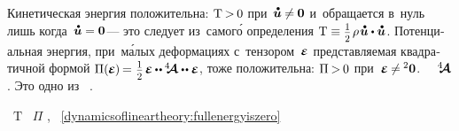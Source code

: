 \begin{otherlanguage}{russian}
\vspace{-0.1em}
Кинетическая энергия положительна: ${\mathrm{T} \hspace{-0.2ex} > \hspace{-0.2ex} 0}$ при~${\mathdotabove{\bm{u}} \hspace{-0.1ex} \neq \hspace{-0.1ex} \bm{0}}$ и~обращается в~нуль лишь когда~${\mathdotabove{\bm{u}} = \bm{0}}$\:--- это следует из~самог\'{о} определения ${\mathrm{T} \equiv \smalldisplaystyleonehalf \hspace{.2ex} \rho \hspace{0.2ex} \mathdotabove{\bm{u}} \dotp \mathdotabove{\bm{u}}}$.
Потенциальная энергия, при~м\'{а}лых деформациях с~тензором~$\mathboldepsilon$ представляемая квадратичной формой
${\Pi(\hspace{-0.1ex}\mathboldepsilon\hspace{-0.1ex}) \hspace{-0.2ex} = \hspace{.1ex} \smash{\smalldisplaystyleonehalf} \hspace{.25ex} \mathboldepsilon \hspace{-0.1ex} \dotdotp \hspace{-0.1ex} \stiffnesstensor \dotdotp \mathboldepsilon}$, тоже положительна: ${\Pi \hspace{-0.16ex} > \hspace{-0.2ex} 0}$ при~${\mathboldepsilon \hspace{-0.1ex} \neq \hspace{-0.1ex} {^2\bm{0}}}$.
   ~~$\hspace{.08ex}{^4\hspace{-0.72ex}\bm{\mathcal{A}}}\hspace{.08ex}$.
Это одно из ~\cite{lurie-nonlinearelasticity, truesdell-firstcourse}.

~$\mathrm{T}$ ~$\Pi$ , ~\eqref{dynamicsoflineartheory:fullenergyiszero} 


\end{otherlanguage}
